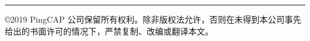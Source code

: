 \noindent \rule{\textwidth}{1pt}

©2019 PingCAP 公司保留所有权利。除非版权法允许，否则在未得到本公司事先给出的书面许可的情况下，严禁复制、改编或翻译本文。